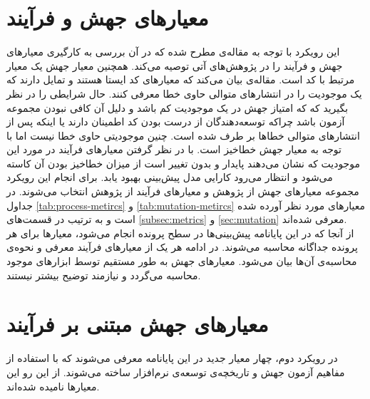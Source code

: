\section{معیارهای جهش و فرآیند}
\label{sec:method-phase1}

این رویکرد با توجه به مقاله‌ی \cite{bowes2016mutation} مطرح شده که در آن بررسی به کارگیری معیارهای جهش و فرآیند را در پژوهش‌های آتی توصیه می‌کند.  همچنین  معیار جهش یک معیار  مرتبط با کد است. مقاله‌ی \cite{rahman2013and}  بیان می‌کند که معیارهای کد ایستا هستند و تمایل دارند که یک موجودیت را در انتشارهای متوالی حاوی خطا معرفی کنند. حال شرایطی را در نظر بگیرید که که امتیاز جهش در یک موجودیت کم باشد و دلیل آن کافی نبودن مجموعه آزمون باشد چراکه توسعه‌دهندگان از درست بودن کد اطمینان دارند یا اینکه پس از انتشارهای متوالی خطاها بر طرف شده است. چنین موجودیتی حاوی خطا نیست اما با توجه به معیار جهش خطا‌خیز است. با در نظر گرفتن معیارهای فرآیند در مورد این موجودیت که نشان می‌دهند پایدار و بدون تغییر است از میزان خطا‌خیز بودن آن کاسته می‌شود و انتظار می‌رود کارایی مدل پیش‌بینی بهبود یابد. 
برای  انجام این رویکرد مجموعه معیارهای جهش  از پژوهش \cite{bowes2016mutation}  و معیارهای فرآیند از پژوهش \cite{rahman2013and} انتخاب می‌شوند. در جداول  \ref{tab:process-metircs} و \ref{tab:mutation-metircs} معیارهای مورد نظر آورده شده است و به ترتیب در قسمت‌های \ref{subsec:metrics} و \ref{sec:mutation} معرفی شده‌اند.\\


از آنجا که  در این پایانامه پیش‌بینی‌ها در سطح پرونده انجام می‌شود، معیارها برای هر پرونده جداگانه محاسبه می‌شوند. در ادامه هر یک از معیارهای فرآیند معرفی و نحوه‌ی محاسبه‌ی آن‌ها بیان می‌شود. معیارهای جهش به طور مستقیم توسط ابزارهای موجود محاسبه‌ می‌گردد و نیازمند توضیح بیشتر نیستند.\\




\section{معیارهای جهش مبتنی بر فرآیند}
\label{sec:method-phase-two}
در رویکرد دوم، چهار معیار جدید در این پایانامه معرفی می‌شوند که با استفاده از مفاهیم آزمون جهش و تاریخچه‌ی توسعه‌ی نرم‌افزار ساخته می‌شوند. از این رو این معیارها   نامیده شده‌اند.

